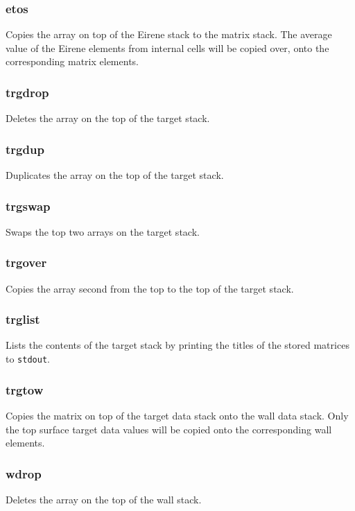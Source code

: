 \documentclass[a4paper,10pt]{report}
\begin{document}
\subsubsection{etos}\label{sec:etos}
Copies the array on top of the Eirene stack to the matrix stack. The average value of the Eirene elements from internal cells will be copied over, onto the corresponding matrix elements.

\subsubsection{trgdrop}\label{sec:trgdrop}
Deletes the array on the top of the target stack.

\subsubsection{trgdup}\label{sec:trgdup}
Duplicates the array on the top of the target stack.

\subsubsection{trgswap}\label{sec:trgswap}
Swaps the top two arrays on the target stack.

\subsubsection{trgover}\label{sec:trgover}
Copies the array second from the top to the top of the target stack.

\subsubsection{trglist}\label{sec:trglist}
Lists the contents of the target stack by printing the titles
of the stored matrices to {\tt stdout}.

\subsubsection{trgtow}\label{sec:trgtow}
Copies the matrix on top of the target data stack onto the wall data stack. Only the
top surface target data values will be copied onto the corresponding wall elements.

\subsubsection{wdrop}\label{sec:wdrop}
Deletes the array on the top of the wall stack.
\end{document}
